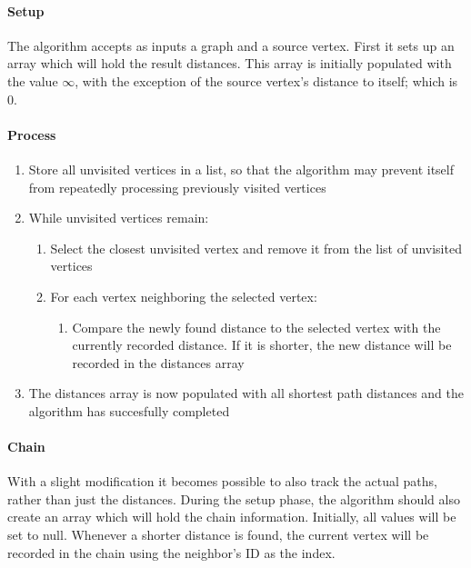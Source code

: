 \documentclass{article}
\begin{document}
\paragraph{Setup}
The algorithm accepts as inputs a graph and a source vertex. First it sets up an array which will hold the result
distances. This array is initially populated with the value \(\infty\), with the exception of the source vertex's
distance to itself; which is 0.

\paragraph{Process}
\begin{enumerate}
\item{Store all unvisited vertices in a list, so that the algorithm may prevent itself from repeatedly processing previously
    visited vertices}
\item{While unvisited vertices remain:}
  \begin{enumerate}
  \item{Select the closest unvisited vertex and remove it from the list of unvisited vertices}
  \item{For each vertex neighboring the selected vertex:}
    \begin{enumerate}
    \item{Compare the newly found distance to the selected vertex with the currently recorded distance. If it is shorter,
        the new distance will be recorded in the distances array}
    \end{enumerate}
  \end{enumerate}
\item{The distances array is now populated with all shortest path distances and the algorithm has succesfully completed}
\end{enumerate}

\paragraph{Chain}
With a slight modification it becomes possible to also track the actual paths, rather than just the distances.
During the setup phase, the algorithm should also create an array which will hold the chain information.
Initially, all values will be set to null. Whenever a shorter distance is found, the current vertex will be
recorded in the chain using the neighbor's ID as the index.
\end{document}
